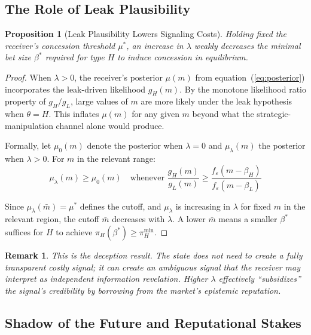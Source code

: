 \documentclass[12pt]{article}
\newtheorem{proposition}{Proposition}
\newtheorem{remark}{Remark}
\begin{document}
\subsection{The Role of Leak Plausibility}

\begin{proposition}[Leak Plausibility Lowers Signaling Costs]\label{prop:lambda}
Holding fixed the receiver's concession threshold $\mu^*$, an increase in $\lambda$ weakly decreases the minimal bet size $\beta^*$ required for type $H$ to induce concession in equilibrium.
\end{proposition}

\begin{proof}
When $\lambda > 0$, the receiver's posterior $\mu(m)$ from equation~(\ref{eq:posterior}) incorporates the leak-driven likelihood $g_H(m)$. By the monotone likelihood ratio property of $g_H/g_L$, large values of $m$ are more likely under the leak hypothesis when $\theta = H$. This inflates $\mu(m)$ for any given $m$ beyond what the strategic-manipulation channel alone would produce.

Formally, let $\mu_0(m)$ denote the posterior when $\lambda = 0$ and $\mu_\lambda(m)$ the posterior when $\lambda > 0$. For $m$ in the relevant range:
\begin{equation}
\mu_\lambda(m) \geq \mu_0(m) \quad \text{whenever } \frac{g_H(m)}{g_L(m)} \geq \frac{f_\varepsilon(m - \beta_H)}{f_\varepsilon(m - \beta_L)}
\end{equation}

Since $\mu_\lambda(\bar{m}) = \mu^*$ defines the cutoff, and $\mu_\lambda$ is increasing in $\lambda$ for fixed $m$ in the relevant region, the cutoff $\bar{m}$ decreases with $\lambda$. A lower $\bar{m}$ means a smaller $\beta^*$ suffices for $H$ to achieve $\pi_H(\beta^*) \geq \pi_H^{\min}$.
\end{proof}

\begin{remark}
This is the deception result. The state does not need to create a fully transparent costly signal; it can create an ambiguous signal that the receiver may interpret as independent information revelation. Higher $\lambda$ effectively ``subsidizes'' the signal's credibility by borrowing from the market's epistemic reputation.
\end{remark}

\subsection{Shadow of the Future and Reputational Stakes}
\end{document}
